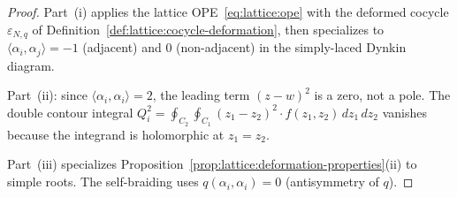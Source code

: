 \begin{proof}
Part~(i) applies the lattice OPE~\eqref{eq:lattice:ope} with the
deformed cocycle $\varepsilon_{N,q}$ of
Definition~\ref{def:lattice:cocycle-deformation}, then specializes to
$\langle\alpha_i,\alpha_j\rangle = -1$ (adjacent) and $0$
(non-adjacent) in the simply-laced Dynkin diagram.

Part~(ii): since $\langle\alpha_i,\alpha_i\rangle = 2$, the
leading term $(z-w)^2$ is a zero, not a pole. The double
contour integral
$Q_i^2 = \oint_{C_2}\oint_{C_1}
 (z_1-z_2)^2 \cdot f(z_1,z_2)\,dz_1\,dz_2$
vanishes because the integrand is holomorphic at $z_1 = z_2$.

Part~(iii) specializes
Proposition~\ref{prop:lattice:deformation-properties}(ii) to
simple roots. The self-braiding uses $q(\alpha_i,\alpha_i) = 0$
(antisymmetry of $q$).
\end{proof}

